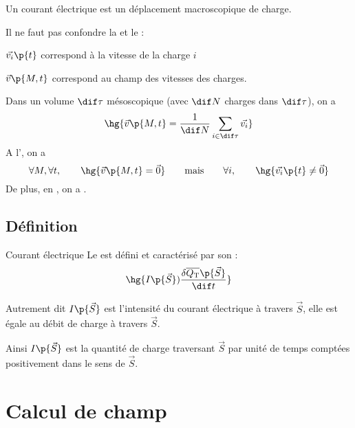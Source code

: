     Un courant électrique est un déplacement macroscopique de charge.
    
    \begin{warning}{}{}
        Il ne faut pas confondre la  et le  :
        \begin{enumerate}
            \itt $\vec{v_i}\p{t}$ correspond à la vitesse de la charge $i$
            
            \itt $\vec{v}\p{M, t}$ correspond au champ des vitesses des charges.
        \end{enumerate}
        Dans un volume $\dif \tau$ mésoscopique (avec $\dif N$ charges dans $\dif \tau$), on a 
        \[ \hg{\vec{v}\p{M, t} = \dfrac{1}{\dif N} \sum_{i \in \dif \tau} \vec{v_i}}\]
        A l', on a 
        \[ \forall M, \forall t, \qquad \hg{\vec{v}\p{M, t} = \vec{0}} \qquad\text{mais}\qquad \forall i,\qquad \hg{\vec{v_i}\p{t} \neq \vec{0}}\]
        De plus, en , on a .
    \end{warning}
    
    \subsection{Définition}
    
    \begin{definition}{Courant électrique}{}
        Le  est défini et caractérisé par son  :
        \[ \hg{I\p{\vec{S}} ) \dfrac{\delta \overline{Q_\text T}\p{\vec{S}}}{\dif t}} \]
    \end{definition}
    \begin{form}{Autrement dit}{}
        $I\p{\vec S}$ est l'intensité du courant électrique à travers $\vec{S}$, elle est égale au débit de charge à travers $\vec S$.
            
        Ainsi $I\p{\vec{S}}$ est la quantité de charge traversant $\vec S$ par unité de temps comptées positivement dans le sens de $\vec S$.
    \end{form}
    
    
    \newpage
    
    \section{Calcul de champ}
    
